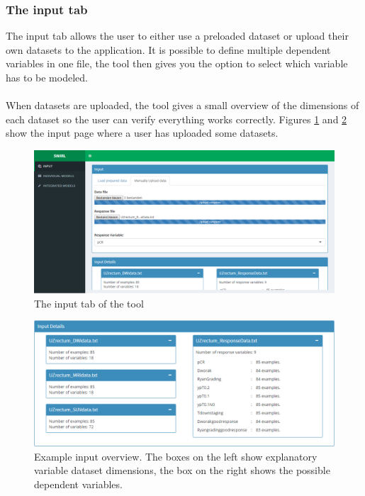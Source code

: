 \subsubsection{The input tab}
The input tab allows the user to either use a preloaded dataset or upload their own datasets to the application. It is possible to define multiple dependent variables in one file, the tool then gives you the option to select which variable has to be modeled. \\ \\
When datasets are uploaded, the tool gives a small overview of the dimensions of each dataset so the user can verify everything works correctly. Figures \ref{fig:tool-input} and \ref{fig:tool-input2} show the input page where a user has uploaded some datasets.
\begin{figure}
	\centering
	\includegraphics[scale=.3]{images/tool_input_1}
	\caption{The input tab of the tool}
	\label{fig:tool-input}
\end{figure}
\begin{figure}
	\centering
	\includegraphics[scale=.4]{images/tool_input_overview}
	\caption{Example input overview. The boxes on the left show explanatory variable dataset dimensions, the box on the right shows the possible dependent variables.}
	\label{fig:tool-input2}
\end{figure}
